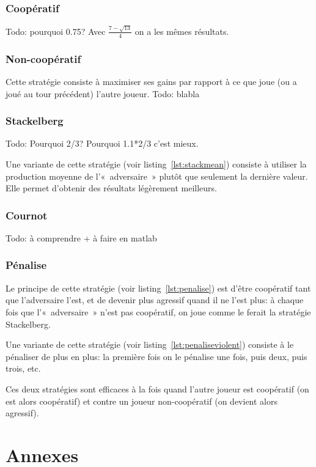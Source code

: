 \documentclass{scrartcl}
\begin{document}
    \subsubsection{Coopératif}
    Todo: pourquoi 0.75? Avec $\frac{7-\sqrt{13}}{4}$ on a les mêmes résultats.

    \subsubsection{Non-coopératif}
      Cette stratégie consiste à maximiser ses gains par rapport à ce que joue
      (ou a joué au tour précédent) l'autre joueur.
      Todo: blabla

    \subsubsection{Stackelberg}
      Todo: Pourquoi 2/3? Pourquoi 1.1*2/3 c'est mieux.

      Une variante de cette stratégie (voir listing~\ref{lst:stackmean})
      consiste à utiliser la production moyenne de l'«~adversaire~» plutôt que
      seulement la dernière valeur. Elle permet d'obtenir des résultats
      légèrement meilleurs.

    \subsubsection{Cournot}
      Todo: à comprendre + à faire en matlab

    \subsubsection{Pénalise}
      Le principe de cette stratégie (voir listing~\ref{lst:penalise}) est
      d'être coopératif tant que l'adversaire l'est, et de devenir plus
      agressif quand il ne l'est plus: à chaque fois que l'«~adversaire~» n'est
      pas coopératif, on joue comme le ferait la stratégie Stackelberg.

      Une variante de cette stratégie (voir listing~\ref{lst:penaliseviolent})
      consiste à le pénaliser de plus en plus: la première fois on le pénalise
      une fois, puis deux, puis trois, etc.

      Ces deux stratégies sont efficaces à la fois quand l'autre joueur est
      coopératif (on est alors coopératif) et contre un joueur non-coopératif
      (on devient alors agressif).

\section{Annexes}
  
  
  
  
\end{document}
